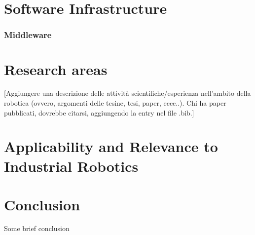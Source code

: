 \documentclass[conference]{IEEEtran}
\begin{document}
\section{Software Infrastructure}
\subsubsection{Middleware}

\section{Research areas}

[Aggiungere una descrizione delle attività scientifiche/esperienza nell'ambito della robotica (ovvero, argomenti delle tesine, tesi, paper, eccc..). Chi ha paper pubblicati, dovrebbe citarsi, aggiungendo la entry nel file .bib.]

\section{Applicability and Relevance to Industrial Robotics}


\section{Conclusion}
Some brief conclusion


 

\end{document}

